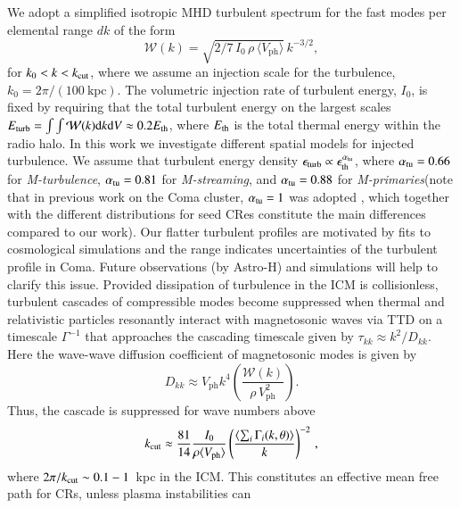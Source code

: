 \documentclass[useAMS,usenatbib]{mn2e}
\newcommand{\Mstream}{{\it M-streaming}\xspace}
\newcommand{\Mflatturb}{{\it M-turbulence}\xspace}
\newcommand{\Mprimary}{{\it M-primaries}\xspace}
\newcommand{\Vph}{V_\mathrm{ph}}
\begin{document}
We adopt a simplified isotropic MHD turbulent spectrum for the fast
modes per elemental range $dk$ of the form
\begin{equation}
  \label{eq:Wk}
  \mathcal{W}(k) =
\sqrt{2/7\,I_0\,\rho\,\langle \Vph \rangle}\,k^{-3/2},
\end{equation}
for $k_0<k<k_{\mathrm{cut}}$, where we assume an injection scale for the
turbulence, $k_0= 2\pi/(100~\mbox{kpc})$. The volumetric injection
rate of turbulent energy, $I_0$, is fixed by requiring that the total
turbulent energy on the largest scales $E_{\mathrm{turb}}=\int \int
\mathcal{W}(k) {\mathrm{d}}k {\mathrm{d}}V \approx 0.2 E_{\mathrm{th}}$, where
$E_{\mathrm{th}}$ is the total thermal energy \citep{brunetti07,brunetti11}
within the radio halo. In this work we investigate different spatial
models for injected turbulence. We assume that turbulent energy
density $\epsilon_{\mathrm{turb}} \propto
\epsilon_{\mathrm{th}}^{\alpha_{\mathrm{tu}}}$, where $\alpha_{\mathrm{tu}}= 0.66$
for \Mflatturb, $\alpha_{\mathrm{tu}}= 0.81$ for \Mstream, and
$\alpha_{\mathrm{tu}}= 0.88$ for \Mprimary (note that in previous work on
the Coma cluster, $\alpha_{\mathrm{tu}}= 1$ was adopted \citep{brunetti12},
which together with the different distributions for seed CRes
constitute the main differences compared to our work). Our flatter
turbulent profiles are motivated by fits to cosmological simulations
\citep{2009ApJ...705.1129L,2010ApJ...725.1452S,2012ApJ...758...74B}
and the range indicates uncertainties of the turbulent profile in
Coma. Future observations (by Astro-H) and simulations will help to
clarify this issue. Provided dissipation of turbulence in the ICM is
collisionless, turbulent cascades of compressible modes become
suppressed when thermal and relativistic particles resonantly interact
with magnetosonic waves via TTD on a timescale $\Gamma^{-1}$ that
approaches the cascading timescale given by $\tau_{kk} \approx
k^2/D_{kk}$. Here the wave-wave diffusion coefficient of magnetosonic
modes is given by
\begin{equation}
\label{eq:Dkk}
D_{kk} \approx \Vph k^4
\left(\frac{\mathcal{W}(k)}{\rho\,\Vph^2}\right).
\end{equation}
Thus, the cascade is suppressed for wave numbers above
\begin{equation}
\label{eq:kc}
  k_\rmn{cut} \approx \frac{81}{14} \frac{I_0}{\rho \langle \Vph \rangle}
  \left(\frac{\langle\sum_i \Gamma_i(k,\theta)\rangle}{k}\right)^{-2}\,,
\end{equation}
where $2\pi/k_{\mathrm{cut}}\sim 0.1-1$~kpc in the ICM. This constitutes an
effective mean free path for CRs, unless plasma instabilities can
\end{document}
